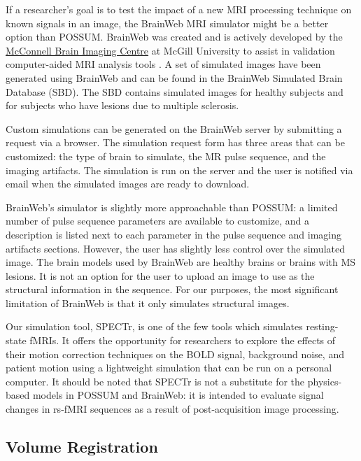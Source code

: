 If a researcher's goal is to test the impact of a new MRI processing technique on known signals in an image, the BrainWeb MRI simulator might be a better option than POSSUM. BrainWeb was created and is actively developed by the \href{mcgill.ca/bic/}{McConnell Brain Imaging Centre} at McGill University to assist in validation computer-aided MRI analysis tools \cite{kwan1999mri} \cite{collins1998design} \cite{cocosco1997brainweb} \cite{kwan1996extensible}. A set of simulated images have been generated using BrainWeb and can be found in the BrainWeb Simulated Brain Database (SBD). The SBD contains simulated images for healthy subjects and for subjects who have lesions due to multiple sclerosis.

Custom simulations can be generated on the BrainWeb server by submitting a request via a browser. The simulation request form has three areas that can be customized: the type of brain to simulate, the MR pulse sequence, and the imaging artifacts. The simulation is run on the server and the user is notified via email when the simulated images are ready to download. 

BrainWeb's simulator is slightly more approachable than POSSUM: a limited number of pulse sequence parameters are available to customize, and a description is listed next to each parameter in the pulse sequence and imaging artifacts sections. However, the user has slightly less control over the simulated image. The brain models used by BrainWeb are healthy brains or brains with MS lesions. It is not an option for the user to upload an image to use as the structural information in the sequence. For our purposes, the most significant limitation of BrainWeb is that it only simulates structural images. 

Our simulation tool, SPECTr, is one of the few tools which simulates resting-state fMRIs. It offers the opportunity for researchers to explore the effects of their motion correction techniques on the BOLD signal, background noise, and patient motion using a lightweight simulation that can be run on a personal computer. It should be noted that SPECTr is not a substitute for the physics-based models in POSSUM and BrainWeb: it is intended to evaluate signal changes in rs-fMRI sequences as a result of post-acquisition image processing.

\subsection{Volume Registration} 


